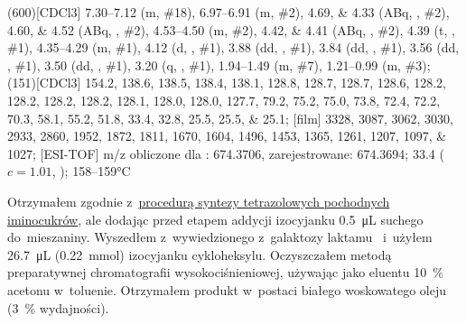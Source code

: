 \begin{fullexp}
  \NMR(600)[CDCl3] \numrange{7.30}{7.12} (m, \#{18}), \numrange{6.97}{6.91} (m, \#{2}), \numlist{4.69;4.33} (ABq, , \#{2}), \numlist{4.60;4.52} (ABq, , \#{2}), \numrange{4.53}{4.50} (m, \#{2}), \numlist{4.42;4.41} (ABq, , \#{2}), \num{4.39} (t, , \#{1}), \numrange{4.35}{4.29} (m, \#{1}), \num{4.12} (d, , \#{1}), \num{3.88} (dd, , \#{1}), \num{3.84} (dd, , \#{1}), \num{3.56} (dd, , \#{1}), \num{3.50} (dd, , \#{1}), \num{3.20} (q, , \#{1}), \numrange{1.94}{1.49} (m, \#{7}), \numrange{1.21}{0.99} (m, \#{3});
  (151)[CDCl3] \numlist{154.2; 138.6; 138.5; 138.4; 138.1; 128.8; 128.7; 128.7; 128.6; 128.2; 128.2; 128.2; 128.2; 128.1; 128.0; 128.0; 127.7; 79.2; 75.2; 75.0; 73.8; 72.4; 72.2; 70.3; 58.1; 55.2; 51.8; 33.4; 32.8; 25.5; 25.5; 25.1};
  [film] \numlist{3328; 3087; 3062; 3030; 2933; 2860; 1952; 1872; 1811; 1670; 1604; 1496; 1453; 1365; 1261; 1207; 1097; 1027};
  [ESI-TOF] m/z obliczone dla : \num{674.3706}, zarejestrowane: \num{674.3694};
  \data{[$\alpha^{23}_D$]~$=$} \num{33.4} ($c = 1.01$, );
   \numrange{158}{159}\si{\celsius}
\end{fullexp}

Otrzymałem zgodnie z~\hyperref[experimental:sugars:schwartz]{procedurą syntezy tetrazolowych
  pochodnych iminocukrów}, ale dodając przed etapem addycji izocyjanku
  \SI{0.5}{\micro\liter} suchego  do~mieszaniny.
Wyszedłem z~wywiedzionego z~galaktozy laktamu~
  i~użyłem \SI{26.7}{\micro\liter} (\SI{0.22}{\milli\mol}) izocyjanku cykloheksylu.
Oczyszczałem metodą preparatywnej chromatografii wysokociśnieniowej,
  używając jako eluentu \SI{10}{\percent} acetonu w~toluenie.
Otrzymałem produkt w~postaci białego woskowatego oleju (\SI{3}{\percent} wydajności).

